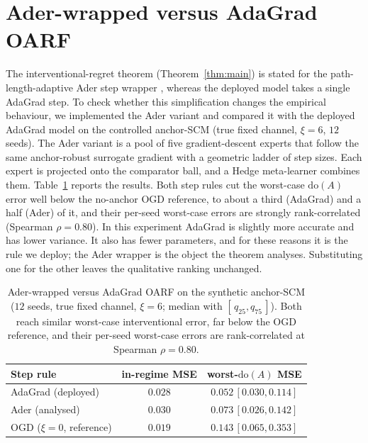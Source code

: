 \documentclass[12pt]{article}
\theoremstyle{plain}
\theoremstyle{remark}
\newcommand{\doop}{\mathrm{do}}
\newcommand{\OARF}{\textsc{OARF}}
\begin{document}
\section{Ader-wrapped versus AdaGrad OARF}\label{app:ader}
The interventional-regret theorem (Theorem~\ref{thm:main}) is stated for the
path-length-adaptive Ader step wrapper \citep{zhang2018adaptive}, whereas the deployed
model takes a single AdaGrad step. To check whether this simplification changes the
empirical behaviour, we implemented the Ader variant and compared it with the deployed
AdaGrad model on the controlled anchor-SCM (true fixed channel, $\xi=6$, $12$ seeds).
The Ader variant is a pool of five gradient-descent experts that follow the same
anchor-robust surrogate gradient with a geometric ladder of step sizes. Each expert is
projected onto the comparator ball, and a Hedge meta-learner combines them.
Table~\ref{tab:ader} reports the results. Both step rules cut the worst-case $\doop(A)$ error well below the no-anchor OGD reference, to about a third (AdaGrad) and a half (Ader) of it, and their per-seed worst-case
errors are strongly rank-correlated (Spearman $\rho=0.80$). In this experiment AdaGrad
is slightly more accurate and has lower variance. It also has fewer parameters, and for
these reasons it is the rule we deploy; the Ader wrapper is the object the theorem
analyses. Substituting one for the other leaves the qualitative ranking unchanged.

\begin{table}[htbp]
\centering
\caption{Ader-wrapped versus AdaGrad \OARF{} on the synthetic anchor-SCM ($12$ seeds,
true fixed channel, $\xi=6$; median with $[\,q_{25},q_{75}\,]$). Both reach similar
worst-case interventional error, far below the OGD reference, and their per-seed worst-case
errors are rank-correlated at Spearman $\rho=0.80$.}
\label{tab:ader}
\small
\begin{tabular}{lcc}
\toprule
Step rule & in-regime MSE & worst-$\doop(A)$ MSE\\
\midrule
AdaGrad (deployed) & $0.028$ & $0.052\,[0.030,0.114]$\\
Ader (analysed)    & $0.030$ & $0.073\,[0.026,0.142]$\\
\midrule
OGD ($\xi=0$, reference) & $0.019$ & $0.143\,[0.065,0.353]$\\
\bottomrule
\end{tabular}
\end{table}
\end{document}
